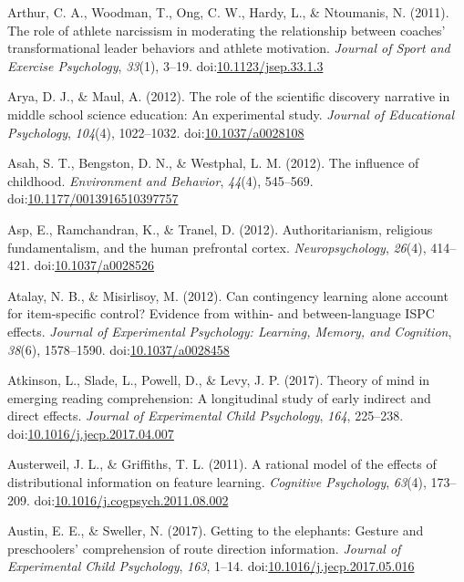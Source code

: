 \documentclass[english,man]{apa6}
\theoremstyle{definition}
\theoremstyle{definition}
\theoremstyle{definition}
\theoremstyle{remark}
\begin{document}
\hypertarget{ref-Arthur2011}{}
Arthur, C. A., Woodman, T., Ong, C. W., Hardy, L., \& Ntoumanis, N.
(2011). The role of athlete narcissism in moderating the relationship
between coaches' transformational leader behaviors and athlete
motivation. \emph{Journal of Sport and Exercise Psychology},
\emph{33}(1), 3--19.
doi:\href{https://doi.org/10.1123/jsep.33.1.3}{10.1123/jsep.33.1.3}

\hypertarget{ref-Arya2012}{}
Arya, D. J., \& Maul, A. (2012). The role of the scientific discovery
narrative in middle school science education: An experimental study.
\emph{Journal of Educational Psychology}, \emph{104}(4), 1022--1032.
doi:\href{https://doi.org/10.1037/a0028108}{10.1037/a0028108}

\hypertarget{ref-Asah2012}{}
Asah, S. T., Bengston, D. N., \& Westphal, L. M. (2012). The influence
of childhood. \emph{Environment and Behavior}, \emph{44}(4), 545--569.
doi:\href{https://doi.org/10.1177/0013916510397757}{10.1177/0013916510397757}

\hypertarget{ref-Asp2012}{}
Asp, E., Ramchandran, K., \& Tranel, D. (2012). Authoritarianism,
religious fundamentalism, and the human prefrontal cortex.
\emph{Neuropsychology}, \emph{26}(4), 414--421.
doi:\href{https://doi.org/10.1037/a0028526}{10.1037/a0028526}

\hypertarget{ref-Atalay2012}{}
Atalay, N. B., \& Misirlisoy, M. (2012). Can contingency learning alone
account for item-specific control? Evidence from within- and
between-language ISPC effects. \emph{Journal of Experimental Psychology:
Learning, Memory, and Cognition}, \emph{38}(6), 1578--1590.
doi:\href{https://doi.org/10.1037/a0028458}{10.1037/a0028458}

\hypertarget{ref-Atkinson2017}{}
Atkinson, L., Slade, L., Powell, D., \& Levy, J. P. (2017). Theory of
mind in emerging reading comprehension: A longitudinal study of early
indirect and direct effects. \emph{Journal of Experimental Child
Psychology}, \emph{164}, 225--238.
doi:\href{https://doi.org/10.1016/j.jecp.2017.04.007}{10.1016/j.jecp.2017.04.007}

\hypertarget{ref-Austerweil2011}{}
Austerweil, J. L., \& Griffiths, T. L. (2011). A rational model of the
effects of distributional information on feature learning.
\emph{Cognitive Psychology}, \emph{63}(4), 173--209.
doi:\href{https://doi.org/10.1016/j.cogpsych.2011.08.002}{10.1016/j.cogpsych.2011.08.002}

\hypertarget{ref-Austin2017}{}
Austin, E. E., \& Sweller, N. (2017). Getting to the elephants: Gesture
and preschoolers' comprehension of route direction information.
\emph{Journal of Experimental Child Psychology}, \emph{163}, 1--14.
doi:\href{https://doi.org/10.1016/j.jecp.2017.05.016}{10.1016/j.jecp.2017.05.016}
\end{document}
